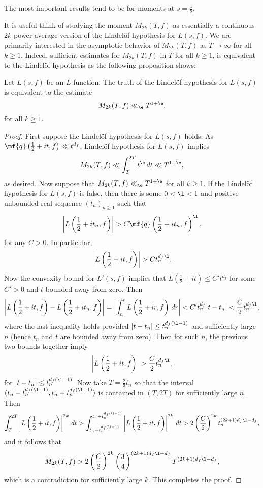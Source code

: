   \begin{remark}
    The most important results tend to be for moments at $s = \frac{1}{2}$.
  \end{remark}

  It is useful think of studying the moment $M_{2k}(T,f)$ as essentially a continuous $2k$-power average version of the Lindel\"of hypothesis for $L(s,f)$. We are primarily interested in the asymptotic behavior of $M_{2k}(T,f)$ as $T \to \infty$ for all $k \ge 1$. Indeed, sufficient estimates for $M_{2k}(T,f)$ in $T$ for all $k \ge 1$, is equivalent to the Lindel\"of hypothesis as the following proposition shows:

  \begin{proposition}\label{prop:equivalence_Lindelof_hypothesis_and_moments}
    Let $L(s,f)$ be an $L$-function. The truth of the Lindel\"of hypothesis for $L(s,f)$ is equivalent to the estimate
    \[
      M_{2k}(T,f) \ll_{\e} T^{1+\e},
    \]
    for all $k \ge 1$.
  \end{proposition}
  \begin{proof}
    First suppose the Lindel\"of hypothesis for $L(s,f)$ holds. As $\mf{q}\left(\frac{1}{2}+it,f\right) \ll t^{d_{f}}$, Lindel\"of hypothesis for $L(s,f)$ implies
    \[
      M_{2k}(T,f) \ll \int_{T}^{2T}t^{\e}\,dt \ll T^{1+\e},
    \]
    as desired. Now suppose that $M_{2k}(T,f) \ll_{\e} T^{1+\e}$ for all $k \ge 1$. If the Lindel\"of hypothesis for $L(s,f)$ is false, then there is some $0 < \l < 1$ and positive unbounded real sequence $(t_{n})_{n \ge 1}$ such that
    \[
      \left|L\left(\frac{1}{2}+it_{n},f\right)\right| > C\mf{q}\left(\frac{1}{2}+it_{n},f\right)^{\l},
    \]
    for any $C > 0$. In particular,
      \[
      \left|L\left(\frac{1}{2}+it,f\right)\right| > Ct_{n}^{d_{f}\l}.
    \]
    Now the convexity bound for $L'(s,f)$ implies that $L\left(\frac{1}{2}+it\right) \le C't^{d_{f}}$ for some $C' > 0$ and $t$ bounded away from zero. Then
    \[
      \left|L\left(\frac{1}{2}+it,f\right)-L\left(\frac{1}{2}+it_{n},f\right)\right| = \left|\int_{t_{n}}^{t}L\left(\frac{1}{2}+ir,f\right)\,dr\right| < C't_{n}^{d_{f}}|t-t_{n}| < \frac{C}{2}t_{n}^{d_{f}\l},
    \]
    where the last inequality holds provided $|t-t_{n}| \le t_{n}^{d_{f}(\l-1)}$ and sufficiently large $n$ (hence $t_{n}$ and $t$ are bounded away from zero). Then for such $n$, the previous two bounds together imply
    \[
      \left|L\left(\frac{1}{2}+it,f\right)\right| > \frac{C}{2}t_{n}^{d_{f}\l},
    \]
    for $|t-t_{n}| \le t_{n}^{d_{f}(\l-1)}$. Now take $T = \frac{2}{3}t_{n}$ so that the interval $(t_{n}-t_{n}^{d_{f}(\l-1)},t_{n}+t_{n}^{d_{f}(\l-1)})$ is contained in $\left(T,2T\right)$ for sufficiently large $n$. Then
    \[
      \int_{T}^{2T}\left|L\left(\frac{1}{2}+it,f\right)\right|^{2k}\,dt > \int_{t_{n}-t_{n}^{d_{f}(\l-1)}}^{t_{n}+t_{n}^{d_{f}(\l-1)}}\left|L\left(\frac{1}{2}+it,f\right)\right|^{2k}\,dt > 2\left(\frac{C}{2}\right)^{2k}t_{n}^{(2k+1)d_{f}\l-d_{f}},
    \]
    and it follows that
    \[
      M_{2k}(T,f) > 2\left(\frac{C}{2}\right)^{2k}\left(\frac{3}{4}\right)^{(2k+1)d_{f}\l-d_{f}}T^{(2k+1)d_{f}\l-d_{f}},
    \]
    which is a contradiction for sufficiently large $k$. This completes the proof.
  \end{proof}

